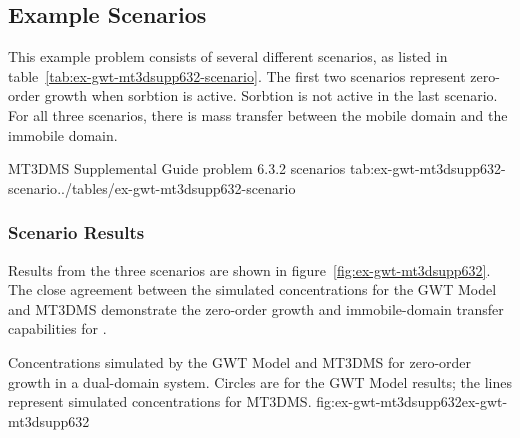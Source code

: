 \subsection{Example Scenarios}

This example problem consists of several different scenarios, as listed in table~\ref{tab:ex-gwt-mt3dsupp632-scenario}.  The first two scenarios represent zero-order growth when sorbtion is active.  Sorbtion is not active in the last scenario.  For all three scenarios, there is mass transfer between the mobile domain and the immobile domain.

\begin{ScenarioTable}{
                                   MT3DMS Supplemental Guide problem 6.3.2 scenarios
                                   }{tab:ex-gwt-mt3dsupp632-scenario}{../tables/ex-gwt-mt3dsupp632-scenario}
\end{ScenarioTable}


\subsubsection{Scenario Results}

Results from the three scenarios are shown in figure~\ref{fig:ex-gwt-mt3dsupp632}.  The close agreement between the simulated concentrations for the \mf GWT Model and MT3DMS demonstrate the zero-order growth and immobile-domain transfer capabilities for \mf.

\begin{StandardFigure}{
                                     Concentrations simulated by the \mf GWT Model and MT3DMS for zero-order growth in a dual-domain system.  Circles are for the GWT Model results; the lines represent simulated concentrations for MT3DMS.
                                     }{fig:ex-gwt-mt3dsupp632}{ex-gwt-mt3dsupp632}
\end{StandardFigure}                                 

